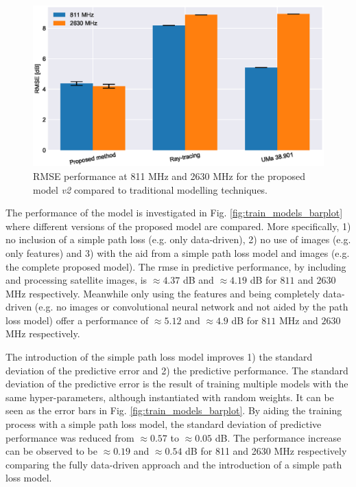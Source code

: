 \begin{figure}
    \centering
    \includegraphics{chapters/part_pathloss/model_aided_paper/model_comparison_bar_group_std_split.eps}
    \caption{RMSE performance at 811 MHz and 2630 MHz for the proposed model \emph{v2} compared to traditional modelling techniques.}
    \label{fig:model_comparison_bar_group}
\end{figure}

The performance of the model is investigated in Fig. \ref{fig:train_models_barplot} where different versions of the proposed model are compared. More specifically, 1) no inclusion of a simple path loss (e.g. only data-driven), 2) no use of images (e.g. only features) and 3) with the aid from a simple path loss model and images (e.g. the complete proposed model). The \gls{rmse} in predictive performance, by including and processing satellite images, is  $\approx 4.37$ dB and $\approx 4.19 $ dB for $811$ and $2630$ MHz respectively. Meanwhile only using the features and being completely data-driven (e.g. no images or convolutional neural network and not aided by the path loss model) offer a performance of $\approx 5.12$ and $\approx 4.9$ dB for $811$ MHz and $2630$ MHz respectively. 

The introduction of the simple path loss model improves 1) the standard deviation of the predictive error and 2) the predictive performance. The standard deviation of the predictive error is the result of training multiple models with the same hyper-parameters, although instantiated with random weights. It can be seen as the error bars in Fig. \ref{fig:train_models_barplot}. By aiding the training process with a simple path loss model, the standard deviation of predictive performance was reduced from $\approx 0.57$ to $\approx 0.05$ dB. The performance increase can be observed to be $\approx 0.19$ and $\approx 0.54$ dB for 811 and 2630 MHz respectively comparing the fully data-driven approach and the introduction of a simple path loss model. 

